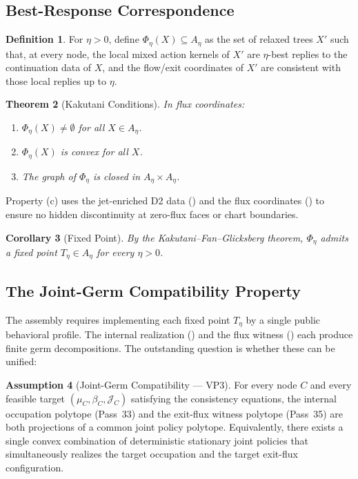 \documentclass[12pt,a4paper]{article}
\newtheorem{theorem}{Theorem}[section]
\newtheorem{corollary}[theorem]{Corollary}
\theoremstyle{definition}
\newtheorem{definition}[theorem]{Definition}
\newtheorem{assumption}[theorem]{Assumption}
\newcommand{\cJ}{\mathcal{J}}
\begin{document}
\subsection{Best-Response Correspondence}

\begin{definition}
For $\eta > 0$, define $\Phi_\eta(X) \subseteq A_\eta$ as the set of relaxed trees $X'$ such that, at every node, the local mixed action kernels of $X'$ are $\eta$-best replies to the continuation data of $X$, and the flow/exit coordinates of $X'$ are consistent with those local replies up to $\eta$.
\end{definition}

\begin{theorem}[Kakutani Conditions]
\label{thm:kakutani-conditions}
In flux coordinates:
\begin{enumerate}[label=(\alph*)]
\item $\Phi_\eta(X) \neq \emptyset$ for all $X \in A_\eta$.
\item $\Phi_\eta(X)$ is convex for all $X$.
\item The graph of $\Phi_\eta$ is closed in $A_\eta \times A_\eta$.
\end{enumerate}
\end{theorem}

Property (c) uses the jet-enriched D2 data () and the flux coordinates () to ensure no hidden discontinuity at zero-flux faces or chart boundaries.

\begin{corollary}[Fixed Point]
\label{cor:fixed-point}
By the Kakutani--Fan--Glicksberg theorem, $\Phi_\eta$ admits a fixed point $T_\eta \in A_\eta$ for every $\eta > 0$.
\end{corollary}

\subsection{The Joint-Germ Compatibility Property}

The assembly requires implementing each fixed point $T_\eta$ by a single public behavioral profile. The internal realization () and the flux witness () each produce finite germ decompositions. The outstanding question is whether these can be unified:

\begin{assumption}[Joint-Germ Compatibility --- VP3]
\label{ass:vp3}
For every node $C$ and every feasible target $(\mu_C, \beta_C, \cJ_C)$ satisfying the consistency equations, the internal occupation polytope (Pass~33) and the exit-flux witness polytope (Pass~35) are both projections of a common joint policy polytope. Equivalently, there exists a single convex combination of deterministic stationary joint policies that simultaneously realizes the target occupation and the target exit-flux configuration.
\end{assumption}
\end{document}
